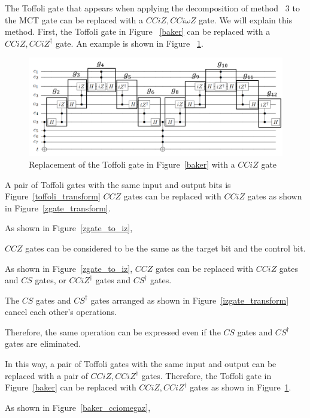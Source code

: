 \par
The Toffoli gate that appears when applying the decomposition of method ~3 to the MCT gate can be replaced with a $CCiZ, CCi\omega Z$ gate.
We will explain this method.
First, the Toffoli gate in Figure ~\ref{baker} can be replaced with a $CCiZ, CCiZ^{\dag}$ gate.
An example is shown in Figure ~\ref{baker_cciz}.
\begin{figure}[tbp]
\centering
\includegraphics[width=0.95\linewidth]{img/baker_izgate_transform.pdf}
\caption{Replacement of the Toffoli gate in Figure~\ref{baker} with a $CCiZ$ gate}
\label{baker_cciz}
\end{figure}
A pair of Toffoli gates with the same input and output bits is
Figure~\ref{toffoli_transform} $CCZ$ gates can be replaced with $CCiZ$ gates as shown in Figure~\ref{zgate_transform}.

As shown in Figure~\ref{zgate_to_iz},

$CCZ$ gates can be considered to be the same as the target bit and the control bit.

As shown in Figure~\ref{zgate_to_iz}, $CCZ$ gates can be replaced with $CCiZ$ gates and $CS$ gates, or $CCiZ^{\dag}$ gates and $CS^{\dag}$ gates.

The $CS$ gates and $CS^{\dag}$ gates arranged as shown in Figure~\ref{izgate_transform} cancel each other's operations.

Therefore, the same operation can be expressed even if the $CS$ gates and $CS^{\dag}$ gates are eliminated.

In this way, a pair of Toffoli gates with the same input and output can be replaced with a pair of $CCiZ, CCiZ^{\dag}$ gates.
Therefore, the Toffoli gate in Figure~\ref{baker} can be replaced with $CCiZ, CCiZ^{\dag}$ gates as shown in Figure~\ref{baker_cciz}.
\par
As shown in Figure~\ref{baker_cciomegaz},


